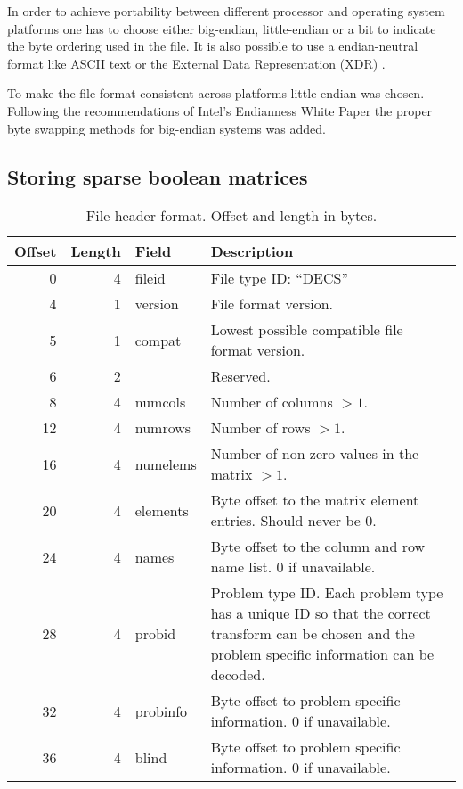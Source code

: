 In order to achieve portability between different processor and operating system platforms one has to choose either big-endian, little-endian or a bit to indicate the byte ordering used in the file.
It is also possible to use a endian-neutral format like ASCII text or the External Data Representation (XDR) \cite{RFC4506}.

To make the file format consistent across platforms little-endian was chosen.
Following the recommendations of Intel's Endianness White Paper \cite{intel-endian} the proper byte swapping methods for big-endian systems was added.




\subsection{Storing sparse boolean matrices}




\begin{table}[htbp]
	\centering
	\begin{tabular}{|r|r|l|p{2.7in}|}
		\hline
		\bf Offset & \bf Length & \bf Field & \bf Description \\ \hline
		0  & 4 & fileid & File type ID: ``DECS'' \\ \hline
		4  & 1 & version & File format version. \\ \hline
		5  & 1 & compat & Lowest possible compatible file format version. \\ \hline
		6  & 2 & & Reserved. \\ \hline
		8  & 4 & numcols & Number of columns $> 1$. \\ \hline
		12 & 4 & numrows & Number of rows $> 1$. \\ \hline
		16 & 4 & numelems & Number of non-zero values in the matrix $> 1$. \\ \hline
		20 & 4 & elements & Byte offset to the matrix element entries. Should never be 0. \\ \hline
		24 & 4 & names & Byte offset to the column and row name list. 0 if unavailable. \\ \hline
		28 & 4 & probid & Problem type ID. Each problem type has a unique ID so that the correct transform can be chosen and the problem specific information can be decoded. \\ \hline
		32 & 4 & probinfo & Byte offset to problem specific information. 0 if unavailable. \\ \hline
		36 & 4 & blind & Byte offset to problem specific information. 0 if unavailable. \\ \hline
	\end{tabular}
	\caption{File header format. Offset and length in bytes.}
	\label{tab:header}
\end{table}


